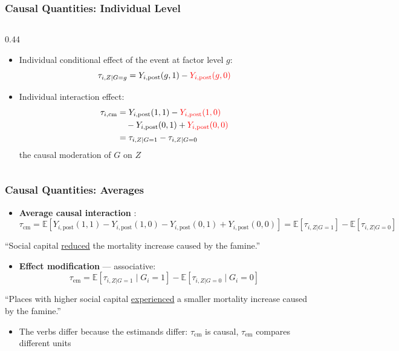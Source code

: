 \documentclass[xcolor=svgnames,9pt,english, aspectratio=169]{beamer}
\newcommand{\red}{\textcolor{red}}
\newcommand{\E}{\ensuremath{\mathbb{E}}}
\newcommand{\tem}{\ensuremath{\tau_{\mathrm{em}}}}
\newcommand{\tcm}{\ensuremath{\tau_{\mathrm{cm}}}}
\newcommand{\pre}{\mathrm{pre}}
\newcommand{\post}{\mathrm{post}}
\newcommand{\potree}[1]{%
\begin{tikzpicture}[x=1cm,y=1cm, font=\footnotesize]
\node[font=\footnotesize\bfseries] at (3.35,3.0) {Pre-Event};
\node[font=\footnotesize\bfseries] at (5.15,3.0) {Post-Event};
\node (root) at (0.1,0) {Unit $i$};
\draw[densely dotted, thick] (0.55,0.15) -- (1.55,1.65);
\draw[densely dotted, thick] (0.55,-0.15) -- (1.55,-1.65);
\node at (0.72,1.22)  {$g=1$};
\node at (0.72,-1.22) {$g=0$};
\draw[densely dotted, thick] (1.6,1.75) -- (2.45,2.3);
\draw[densely dotted, thick] (1.6,1.75) -- (2.45,1.15);
\draw[densely dotted, thick] (1.6,-1.75) -- (2.45,-1.2);
\draw[densely dotted, thick] (1.6,-1.75) -- (2.45,-2.35);
\node at (1.95,2.25)  {$z=1$};
\node at (1.95,1.15)  {$z=0$};
\node at (1.95,-1.2)  {$z=1$};
\node at (1.95,-2.35) {$z=0$};
\node at (3.35,2.35)  {$Y_{i,\pre}(1,1)$};
\node[red] at (3.35,1.15)  {$Y_{i,\pre}(1,0)$};
\node at (3.35,-1.2)  {$Y_{i,\pre}(0,1)$};
\node[red] at (3.35,-2.35) {$Y_{i,\pre}(0,0)$};
\node at (5.15,2.35)  {$Y_{i,\post}(1,1)$};
\node[red] at (5.15,1.15)  {$Y_{i,\post}(1,0)$};
\node at (5.15,-1.2)  {$Y_{i,\post}(0,1)$};
\node[red] at (5.15,-2.35) {$Y_{i,\post}(0,0)$};
\if#11
\draw[decorate,decoration={brace,amplitude=4pt}] (5.95,2.5) -- (5.95,1.0)
  node[midway,right=5pt] {$\tau_{i,Z|G=1}$};
\draw[decorate,decoration={brace,amplitude=4pt}] (5.95,-1.05) -- (5.95,-2.5)
  node[midway,right=5pt] {$\tau_{i,Z|G=0}$};
\draw[decorate,decoration={brace,amplitude=5pt}] (7.6,2.0) -- (7.6,-2.0)
  node[midway,right=6pt] {$\tau_{i,\mathrm{cm}}$};
\fi
\end{tikzpicture}}
\begin{document}
\begin{frame}
  \frametitle{Causal Quantities: Individual Level}
\begin{columns}[T,onlytextwidth]
\begin{column}{0.44\textwidth}
\begin{itemize}[<+->]\itemsep1em
\item Individual conditional effect of the event at factor level $g$:
$$\tau_{i,Z|G=g} = Y_{i,\post}(g,1) - \red{Y_{i,\post}(g,0)}$$
\item Individual interaction effect:
\begin{align*}
\tau_{i,\mathrm{cm}} &= Y_{i,\post}(1,1) - \red{Y_{i,\post}(1,0)}\\
&\quad - Y_{i,\post}(0,1) + \red{Y_{i,\post}(0,0)}\\
&= \tau_{i,Z|G=1} - \tau_{i,Z|G=0}
\end{align*}
the \alert{causal moderation} of $G$ on $Z$
\end{itemize}
\end{column}
\end{columns}
\end{frame}

\begin{frame}
  \frametitle{Causal Quantities: Averages}
\begin{itemize}\itemsep0.6em
\item \textbf{Average causal interaction} {\small\parencite{vanderweele2009distinction,bansak2021estimating}}:
$$\tcm = \E[Y_{i,\post}(1,1) - Y_{i,\post}(1,0) - Y_{i,\post}(0,1) + Y_{i,\post}(0,0)] = \E[\tau_{i,Z|G=1}] - \E[\tau_{i,Z|G=0}]$$
\end{itemize}
\begin{block}{}
\centering ``Social capital \underline{reduced} the mortality increase caused by the famine.''
\end{block}
\medskip\pause
\begin{itemize}\itemsep0.6em
\item \textbf{Effect modification} --- associative:
$$\tem = \E[\tau_{i,Z|G=1} \mid G_i = 1] - \E[\tau_{i,Z|G=0} \mid G_i = 0]$$
\end{itemize}
\begin{block}{}
\centering ``Places with higher social capital \underline{experienced} a smaller mortality increase caused by the famine.''
\end{block}
\medskip\pause
\begin{itemize}
\item The verbs differ because the estimands differ: \tcm{} is causal, \tem{} compares \alert{different units}
\end{itemize}
\end{frame}
\end{document}
